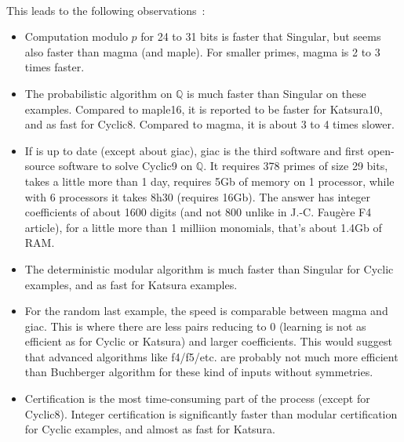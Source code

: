 \documentclass[a4paper,11pt]{article}
\begin{document}
\begin{giacjshere}
\begin{tabular}{|c|c|c|c||c|c|c|}
\hline 
\end{tabular}\\
This leads to the following observations~:
\begin{itemize}
\item Computation modulo $p$ for 24 to 31 bits is faster that Singular, but seems also
  faster than magma (and maple). For smaller primes, magma is 2 to 3
  times faster.
\item The probabilistic algorithm on $\mathbb{Q}$ is much faster than Singular on these examples.
Compared to maple16, it is reported to be faster for Katsura10, 
and as fast for Cyclic8. Compared to magma, it is about 3 to 4
times slower. 
\item If \cite{magma} is up to date (except about giac), giac is the third software and first
  open-source software to solve Cyclic9 on $\mathbb{Q}$. It requires 378
  primes of size 29 bits, takes a little more than 1 day, requires 5Gb
  of memory on 1 processor, while with 6 processors it takes
8h30 (requires 16Gb). The answer has integer coefficients of about 1600 digits
(and not 800 unlike in J.-C. Faug\`ere F4 article), for a little
more than 1 milliion monomials, that's about 1.4Gb of RAM.
\item The deterministic modular algorithm is much faster than Singular for Cyclic examples,
and as fast for Katsura examples. 
\item For the random last example, the speed is comparable between
  magma and giac. This is where there are less pairs reducing to
  0 (learning is not as efficient as for Cyclic or Katsura) and larger
  coefficients. This would suggest that advanced algorithms 
like f4/f5/etc. are probably
not much more efficient than Buchberger algorithm for these kind
of inputs without symmetries.
\item Certification is the most time-consuming part of the process (except
for Cyclic8). Integer certification is significantly faster than modular certification
for Cyclic examples, and almost as fast for Katsura.
\end{itemize}


\end{giacjshere}
\end{document}
